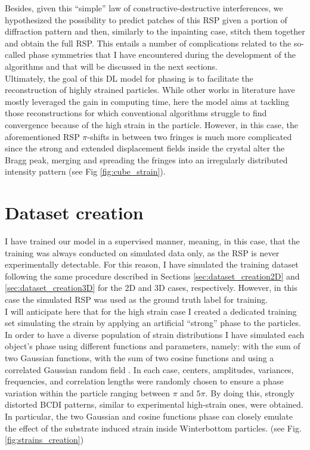 Besides, given this ``simple'' law of constructive-destructive interferences, we hypothesized the possibility to predict patches 
of this RSP given a portion of diffraction pattern and then, similarly to the inpainting case, stitch them together
and obtain the full RSP. This entails a number of complications related to the so-called phase symmetries that I have encountered
during the development of the algorithms and that will be discussed in the next sections. \\
Ultimately, the goal of this DL model for phasing is to facilitate the reconstruction of highly strained particles. While 
other works in literature have mostly leveraged the gain in computing time, here the model aims at tackling those reconstructions for which 
conventional algorithms struggle to find convergence because of the high strain in the particle.   
However, in this case, the aforementioned RSP $\pi$-shifts in between two fringes is much more complicated since the 
strong and extended displacement fields inside the crystal alter the Bragg peak, merging and spreading the fringes 
into an irregularly distributed intensity pattern (see Fig \ref{fig:cube_strain}).

\section{Dataset creation} 

I have trained our model in a supervised manner, meaning, in this case, that the training was always conducted on simulated data 
only, as the RSP is never experimentally detectable. 
For this reason, I have simulated the training dataset following the same procedure described in Sections 
\ref{sec:dataset_creation2D} and \ref{sec:dataset_creation3D} for the 2D and 3D cases, respectively. However, in this
case the simulated RSP was used as the ground truth label for training.\\

I will anticipate here that for the high strain case I created a dedicated training set simulating the strain by applying 
an artificial ``strong'' phase to the particles. In order to have a diverse population of strain distributions I have 
simulated each object's phase using different functions and parameters, namely: with the sum of two Gaussian functions,
with the sum of two cosine functions and using a correlated Gaussian random field \cite{Gaussian_noise1984}. In each 
case, centers, amplitudes, variances, frequencies, and correlation lengths were randomly chosen to ensure a phase 
variation within the particle ranging between 
$\pi$ and $5\pi$. By doing this, strongly distorted BCDI patterns, similar to experimental high-strain ones, were obtained. 
In particular, the two Gaussian and cosine functions phase can closely emulate the effect of the substrate induced strain inside 
Winterbottom particles. (see Fig.\ref{fig:strains_creation})

